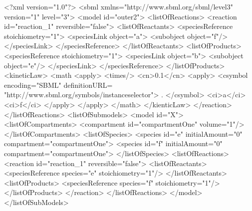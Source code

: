 \documentclass{cekarticle}
\begin{document}
\begin{example}
<?xml version="1.0"?>
<sbml xmlns="http://www.sbml.org/sbml/level3" version="1" level="3">
    <model id="outer2">
        <listOfReactions>
            <reaction id="reaction_1" reversible="false">
                <listOfReactants>
                    <speciesReference stoichiometry="1">
                        <speciesLink object="a">
                            <subobject object="f"/>
                        </speciesLink>
                    </speciesReference>
                </listOfReactants>
                <listOfProducts>
                    <speciesReference stoichiometry="1">
                        <speciesLink object="b">
                            <subobject object="e"/>
                        </speciesLink>
                    </speciesReference>
                </listOfProducts>
                <kineticLaw>
                    <math 
                        <apply>
                            <times/>
                            <cn>0.1</cn>
                            <apply>
                                <csymbol
                                    encoding="SBML" 
                                    definitionURL=
                                        "http://www.sbml.org/symbols/instanceselector">
                                    .
                                </csymbol>
                                <ci>a</ci>
                                <ci>f</ci>
                            </apply>
                        </apply>    
                    </math>
                </kienticLaw>
            </reaction>
        </listOfReactions>
        <listOfSubmodels>
            <model id="X">
                <listOfCompartments>
                    <compartment id="compartmentOne" volume="1"/>
                </listOfCompartments>
                <listOfSpecies>
                    <species id="e" initialAmount="0" compartment="compartmentOne">
                    <species id="f" initialAmount="0" compartment="compartmentOne">
                </listOfSpecies>
                <listOfReactions>
                    <reaction id="reaction_1" reversible="false">
                        <listOfReactants>
                            <speciesReference species="e" stoichiometry="1"/>
                        </listOfReactants>
                        <listOfProducts>
                            <speciesReference species="f" stoichiometry="1"/>
                        </listOfProducts>
                    </reaction>
                </listOfReactions>
            </model>
        </listOfSubModels>

\end{example}
\end{document}
